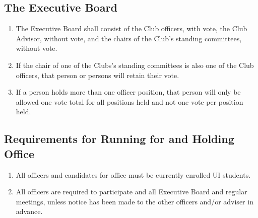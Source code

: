 \documentclass[12pt]{scrartcl} %
\begin{document}
	\subsection{The Executive Board}
		\begin{enumerate}
			\item The Executive Board shall consist of the Club officers, with vote, the Club Advisor, without vote, and the chairs of the Club’s standing committees, without vote.
			\item If the chair of one of the Clubs's standing committees is also one of the Club officers, that person or persons will retain their vote.
			\item If a person holds more than one officer position, that person will only be allowed one vote total for all positions held and not one vote per position held.
		\end{enumerate}

	\subsection{Requirements for Running for and Holding Office}
		\begin{enumerate}
			\item All officers and candidates for office must be currently enrolled UI students.
			\item All officers are required to participate and all Executive Board and regular meetings, unless notice has been made to the other officers and/or adviser in advance.
		\end{enumerate}
\end{document}
